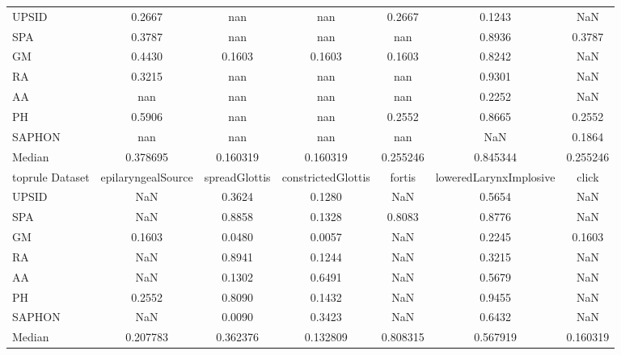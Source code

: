 \documentclass[a4paper,12pt]{article}
\begin{document}
\begin{adjustbox}{max width=\textwidth}
\begin{tabular}{ | l | c | c | c | c | c | c |}
    \midrule
    UPSID &    0.2667 &       nan &       nan &    0.2667 &              0.1243 &                NaN \\
    SPA &    0.3787 &       nan &       nan &       nan &              0.8936 &             0.3787 \\
    GM &    0.4430 &    0.1603 &    0.1603 &    0.1603 &              0.8242 &                NaN \\
    RA &    0.3215 &       nan &       nan &       nan &              0.9301 &                NaN \\
    AA &       nan &       nan &       nan &       nan &              0.2252 &                NaN \\
    PH &    0.5906 &       nan &       nan &    0.2552 &              0.8665 &             0.2552 \\
    SAPHON &       nan &       nan &       nan &       nan &                 NaN &             0.1864 \\
    Median &  0.378695 &  0.160319 &  0.160319 &  0.255246 &            0.845344 &           0.255246 \\
    \bottomrule
    toprule
    Dataset & epilaryngealSource & spreadGlottis & constrictedGlottis &    fortis & loweredLarynxImplosive &     click \\
    \midrule
    UPSID &                NaN &        0.3624 &             0.1280 &       NaN &                 0.5654 &       NaN \\
    SPA &                NaN &        0.8858 &             0.1328 &    0.8083 &                 0.8776 &       NaN \\
    GM &             0.1603 &        0.0480 &             0.0057 &       NaN &                 0.2245 &    0.1603 \\
    RA &                NaN &        0.8941 &             0.1244 &       NaN &                 0.3215 &       NaN \\
    AA &                NaN &        0.1302 &             0.6491 &       NaN &                 0.5679 &       NaN \\
    PH &             0.2552 &        0.8090 &             0.1432 &       NaN &                 0.9455 &       NaN \\
    SAPHON &                NaN &        0.0090 &             0.3423 &       NaN &                 0.6432 &       NaN \\
    Median &           0.207783 &      0.362376 &           0.132809 &  0.808315 &               0.567919 &  0.160319 \\
    \bottomrule
\end{tabular}
\end{adjustbox}
\bigskip
\end{document}
